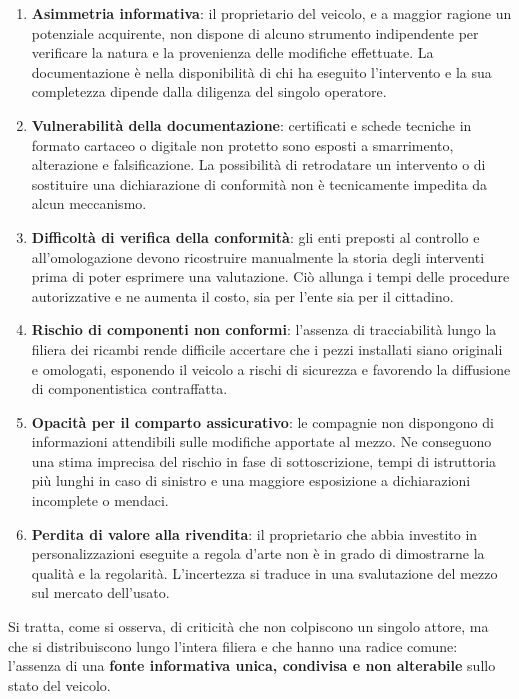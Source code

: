 \begin{enumerate}
    \item \textbf{Asimmetria informativa}: il proprietario del veicolo, e a maggior ragione un potenziale acquirente, non dispone di alcuno strumento indipendente per verificare la natura e la provenienza delle modifiche effettuate. La documentazione \`e nella disponibilit\`a di chi ha eseguito l'intervento e la sua completezza dipende dalla diligenza del singolo operatore.

    \item \textbf{Vulnerabilit\`a della documentazione}: certificati e schede tecniche in formato cartaceo o digitale non protetto sono esposti a smarrimento, alterazione e falsificazione. La possibilit\`a di retrodatare un intervento o di sostituire una dichiarazione di conformit\`a non \`e tecnicamente impedita da alcun meccanismo.

    \item \textbf{Difficolt\`a di verifica della conformit\`a}: gli enti preposti al controllo e all'omologazione devono ricostruire manualmente la storia degli interventi prima di poter esprimere una valutazione. Ci\`o allunga i tempi delle procedure autorizzative e ne aumenta il costo, sia per l'ente sia per il cittadino.

    \item \textbf{Rischio di componenti non conformi}: l'assenza di tracciabilit\`a lungo la filiera dei ricambi rende difficile accertare che i pezzi installati siano originali e omologati, esponendo il veicolo a rischi di sicurezza e favorendo la diffusione di componentistica contraffatta.

    \item \textbf{Opacit\`a per il comparto assicurativo}: le compagnie non dispongono di informazioni attendibili sulle modifiche apportate al mezzo. Ne conseguono una stima imprecisa del rischio in fase di sottoscrizione, tempi di istruttoria pi\`u lunghi in caso di sinistro e una maggiore esposizione a dichiarazioni incomplete o mendaci.

    \item \textbf{Perdita di valore alla rivendita}: il proprietario che abbia investito in personalizzazioni eseguite a regola d'arte non \`e in grado di dimostrarne la qualit\`a e la regolarit\`a. L'incertezza si traduce in una svalutazione del mezzo sul mercato dell'usato.
\end{enumerate}

Si tratta, come si osserva, di criticit\`a che non colpiscono un singolo attore, ma che si distribuiscono lungo l'intera filiera e che hanno una radice comune: l'assenza di una \textbf{fonte informativa unica, condivisa e non alterabile} sullo stato del veicolo.

